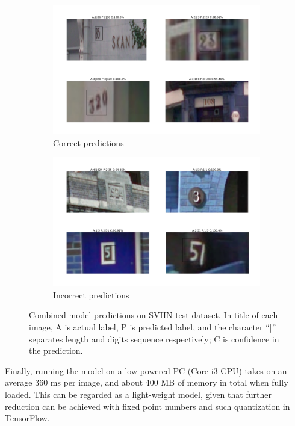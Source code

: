 \documentclass{article}
\begin{document}
	\begin{figure}[!ht]
		\centering
		\begin{subfigure}{\textwidth}
			\centering
			\includegraphics[scale=0.6]{combined_predict_pos}
			\caption{Correct predictions}
			\label{fig:combined_predict_pos}
		\end{subfigure}
		\begin{subfigure}{\textwidth}
			\centering
			\includegraphics[scale=0.6]{combined_predict_neg}
			\caption{Incorrect predictions}
			\label{fig:combined_predict_neg}
		\end{subfigure}
		\caption{Combined model predictions on SVHN test dataset. In title of each image, A is actual label, P is predicted label, and the character ``|'' separates length and digits sequence respectively; C is confidence in the prediction.}
		\label{fig:combined_predict}
	\end{figure}
	
	Finally, running the model on a low-powered PC (Core i3 CPU) takes on an average 360 ms per image, and about 400 MB of memory in total when fully loaded. This can be regarded as a light-weight model, given that further reduction can be achieved with fixed point numbers and such quantization in TensorFlow.
	
\end{document}
